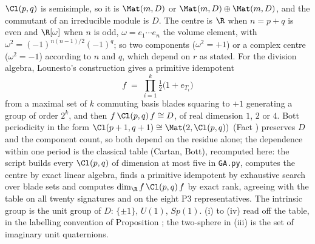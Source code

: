 $\Cl(p,q)$ is semisimple, so it is $\Mat(m, D)$ or $\Mat(m, D) \oplus \Mat(m, D)$, and the commutant of an irreducible module is $D$. The centre is $\R$ when $n = p + q$ is even and $\R[\omega]$ when $n$ is odd, $\omega = e_{1} \cdots e_{n}$ the volume element, with $\omega^{2} = (-1)^{n(n-1)/2}(-1)^{q}$; so two components ($\omega^{2} = +1$) or a complex centre ($\omega^{2} = -1$) according to $n$ and $q$, which depend on $r$ as stated. For the division algebra, Lounesto's construction gives a primitive idempotent
\[
f \;=\; \prod_{i=1}^{k}\tfrac{1}{2}\bigl(1 + e_{T_{i}}\bigr)
\]
from a maximal set of $k$ commuting basis blades squaring to $+1$ generating a group of order $2^{k}$, and then $f\,\Cl(p,q)\,f \cong D$, of real dimension $1$, $2$ or $4$. Bott periodicity in the form $\Cl(p+1, q+1) \cong \Mat(2, \Cl(p,q))$ (Fact ) preserves $D$ and the component count, so both depend on the residue alone; the dependence within one period is the classical table (Cartan, Bott), recomputed here: the script builds every $\Cl(p,q)$ of dimension at most five in \texttt{GA.py}, computes the centre by exact linear algebra, finds a primitive idempotent by exhaustive search over blade sets and computes $\dim_{\R} f\,\Cl(p,q)\,f$ by exact rank, agreeing with the table on all twenty signatures and on the eight P3 representatives. The intrinsic group is the unit group of $D$: $\{\pm 1\}$, $U(1)$, $Sp(1)$. (i) to (iv) read off the table, in the labelling convention of Proposition ; the two-sphere in (iii) is the set of imaginary unit quaternions.
